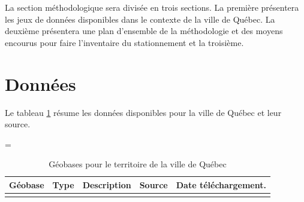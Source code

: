 \label{sec:Methodologie}


La section méthodologique sera divisée en trois sections. La première présentera les jeux de données disponibles dans le contexte de la ville de Québec. La deuxième présentera une plan d'ensemble de la méthodologie et des moyens encourus pour faire l'inventaire du stationnement et la troisième.


\section{Données}
  Le tableau \ref{tab:donnees_disponibles_Québec} résume les données disponibles pour la ville de Québec et leur source.
  \begin{landscape}
    \LTcapwidth=\textwidth
  \begin{longtable}[h!]{p{.2 \linewidth} p{.1 \linewidth} p{.3 \linewidth} p{.15\linewidth} p{.125\linewidth} }
    
    
    \hline
    Géobase & Type & Description  & Source & Date téléchargement.\\ 
    \hline
    \hline
    \endhead
    \hline
    \endfoot
    \hline
    \caption{Géobases pour le territoire de la ville de Québec}
    \label{tab:donnees_disponibles_Québec}
    \endlastfoot
    

\end{longtable}
\end{landscape}
